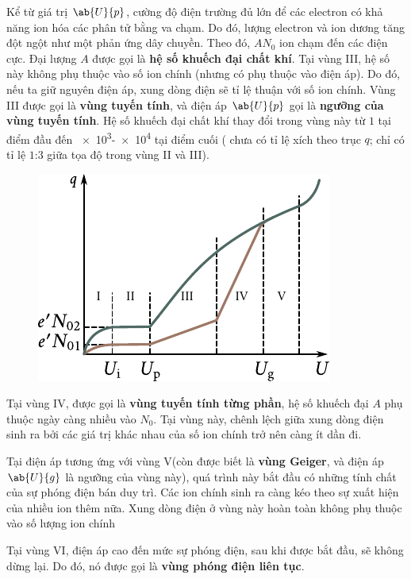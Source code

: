 Kể từ giá trị $\ab{U}{p}$, cường độ điện trường đủ lớn để các electron có khả năng ion hóa các phân tử bằng va chạm. Do đó, lượng electron và ion dương tăng đột ngột như một phản ứng dây chuyền.
Theo đó, $AN_0$ ion chạm đến các điện cực.
Đại lượng $A$ được gọi là \textbf{hệ số khuếch đại chất khí}.
Tại vùng III, hệ số này không phụ thuộc vào số ion chính (nhưng có phụ thuộc vào điện áp).
Do đó, nếu ta giữ nguyên điện áp, xung dòng điện sẽ tỉ lệ thuận với số ion chính.
Vùng III được gọi là \textbf{vùng tuyến tính}, và điện áp $\ab{U}{p}$ gọi là \textbf{ngưỡng của vùng tuyến tính}.
Hệ số khuếch đại chất khí thay đổi trong vùng này từ $1$ tại điểm đầu đến \num{e3}-\num{e4} tại điểm cuối ( chưa có tỉ lệ xích theo trục $q$; chỉ có tỉ lệ $1$:$3$ giữa tọa độ trong 
vùng II và III).

\begin{figure}[t]
	\begin{center}
		\includegraphics[scale=1]{figures/ch_12/fig_12_4.pdf}
		\caption[]{}
		\label{fig:12_4}
	\end{center}
	\vspace{-0.8cm}
\end{figure}

Tại vùng IV, được gọi là \textbf{vùng tuyến tính từng phần}, hệ số khuếch đại $A$ phụ thuộc ngày càng nhiều vào $N_0$.
Tại vùng này, chênh lệch giữa xung dòng điện sinh ra bởi các giá trị khác nhau của số ion chính trở nên càng ít dần đi.

Tại điện áp tương ứng với vùng V(còn được biết là \textbf{vùng Geiger}, và điện áp $\ab{U}{g}$ là ngưỡng của vùng này), quá trình này bắt đầu có những tính chất của sự phóng điện bán duy trì.
Các ion chính sinh ra càng kéo theo sự xuất hiện của nhiều ion thêm nữa.
Xung dòng điện ở vùng này hoàn toàn không phụ thuộc vào số lượng ion chính

Tại vùng VI, điện áp cao đến mức sự phóng điện, sau khi được bắt đầu, sẽ không dừng lại.
Do đó, nó được gọi là \textbf{vùng phóng điện liên tục}.

